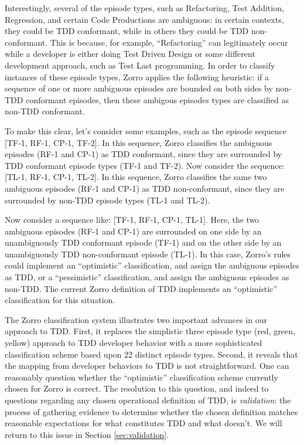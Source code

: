 \documentclass[smallextended]{svjour3}     %
\begin{document}
Interestingly, several of the episode types, such as Refactoring, Test
Addition, Regression, and certain Code Productions are ambiguous: in
certain contexts, they could be TDD conformant, while in others they could
be TDD non-conformant.  This is because, for example, ``Refactoring'' can
legitimately occur while a developer is either doing Test Driven Design or
some different development approach, such as Test Last programming.  In
order to classify instances of these episode types, Zorro applies the
following heuristic: if a sequence of one or more ambiguous episodes are
bounded on both sides by non-TDD conformant episodes, then these ambigous
episodes types are classified as non-TDD conformant.

To make this clear, let's consider some examples, such as the episode
sequence [TF-1, RF-1, CP-1, TF-2].  In this sequence, Zorro classifies the
ambiguous episodes (RF-1 and CP-1) as TDD conformant, since they are
surrounded by TDD conformant episode types (TF-1 and TF-2).  Now consider
the sequence: [TL-1, RF-1, CP-1, TL-2].  In this sequence, Zorro classifies
the same two ambiguous episodes (RF-1 and CP-1) as TDD non-conformant,
since they are surrounded by non-TDD episode types (TL-1 and TL-2).

Now consider a sequence like: [TF-1, RF-1, CP-1, TL-1].  Here, the two
ambiguous episodes (RF-1 and CP-1) are surrounded on one side by an
unambiguously TDD conformant episode (TF-1) and on the other side by an
unambiguously TDD non-conformant episode (TL-1).  In this case, Zorro's
rules could implement an ``optimistic'' classification, and assign the
ambiguous episodes as TDD, or a ``pessimistic'' classification, and assign
the ambiguous episodes as non-TDD.  The current Zorro definition of TDD
implements an ``optimistic'' classification for this situation.

The Zorro classification system illustrates two important advances in our
approach to TDD.  First, it replaces the simplistic three episode type
(red, green, yellow) approach to TDD developer behavior with a more
sophisticated classification scheme based upon 22 distinct episode
types. Second, it reveals that the mapping from developer behaviors to TDD
is not straightforward. One can reasonably question whether the
``optimistic'' classification scheme currently chosen for Zorro is correct.
The resolution to this question, and indeed to questions regarding any
chosen operational definition of TDD, is {\em validation}: the process of
gathering evidence to determine whether the chosen definition matches
reasonable expectations for what constitutes TDD and what doesn't. We will
return to this issue in Section \ref{sec:validation}.
\end{document}
